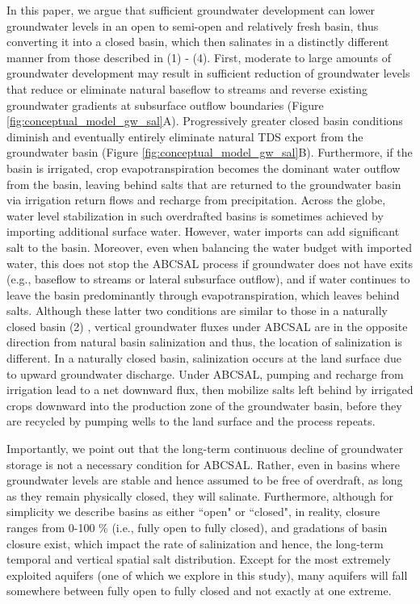 In this paper, we argue that sufficient groundwater development can lower groundwater levels in an open to semi-open and relatively fresh basin, thus converting it into a closed basin, which then salinates in a distinctly different manner from those described in (1) - (4). First, moderate to large amounts of groundwater development may result in sufficient reduction of groundwater levels that reduce or eliminate natural baseflow to streams \citep{Russo2017, Barlow2015, Hunt1999} and reverse existing groundwater gradients at subsurface outflow boundaries (Figure \ref{fig:conceptual_model_gw_sal}A). Progressively greater closed basin conditions diminish and eventually entirely eliminate natural TDS export from the groundwater basin (Figure \ref{fig:conceptual_model_gw_sal}B). Furthermore, if the basin is irrigated, crop evapotranspiration becomes the dominant water outflow from the basin, leaving behind salts that are returned to the groundwater basin via irrigation return flows and recharge from precipitation. Across the globe, water level stabilization in such overdrafted basins is sometimes achieved by importing additional surface water. However, water imports can add significant salt to the basin. Moreover, even when balancing the water budget with imported water, this does not stop the ABCSAL process if groundwater does not have exits (e.g., baseflow to streams or lateral subsurface outflow), and if water continues to leave the basin predominantly through evapotranspiration, which leaves behind salts. Although these latter two conditions are similar to those in a naturally closed basin (2) \citep{Hardie1970, Jones1978}, vertical groundwater fluxes under ABCSAL are in the opposite direction from natural basin salinization and thus, the location of salinization is different. In a naturally closed basin, salinization occurs at the land surface due to upward groundwater discharge. Under ABCSAL, pumping and recharge from irrigation lead to a net downward flux, then mobilize salts left behind by irrigated crops downward into the production zone of the groundwater basin, before they are recycled by pumping wells to the land surface and the process repeats.

Importantly, we point out that the long-term continuous decline of groundwater storage is not a necessary condition for ABCSAL. Rather, even in basins where groundwater levels are stable and hence assumed to be free of overdraft, as long as they remain physically closed, they will salinate. Furthermore, although for simplicity we describe basins as either ``open" or ``closed", in reality, closure ranges from 0-100 \% (i.e., fully open to fully closed), and gradations of basin closure exist, which impact the rate of salinization and hence, the long-term temporal and vertical spatial salt distribution. Except for the most extremely exploited aquifers (one of which we explore in this study), many aquifers will fall somewhere between fully open to fully closed and not exactly at one extreme. 

